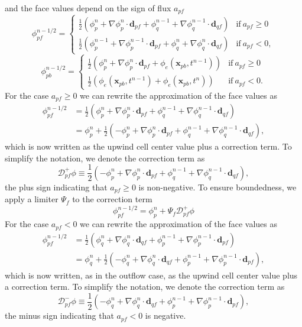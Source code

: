 \documentclass[../thesis.tex]{subfiles}
\begin{document}
and the face values depend on the sign of flux $ a_{pf} $
\[
	\phi_{pf}^{n-1/2} =
	\begin{cases}
		\frac{1}{2}(\phi_p^n + \nabla\phi_p^n\cdot\boldsymbol{d}_{pf} +
		\phi_q^{n-1} + \nabla\phi_q^{n-1}\cdot\boldsymbol{d}_{qf})
		& \text{if}\ a_{pf} \geq 0 \\
		\frac{1}{2}(\phi_p^{n-1} + \nabla\phi_p^{n-1}\cdot\boldsymbol{d}_{pf} +
		\phi_q^{n} + \nabla\phi_q^{n}\cdot\boldsymbol{d}_{qf})
		& \text{if}\ a_{pf} < 0,
	\end{cases}
\]
\[
	\phi_{pb}^{n-1/2} =
	\begin{cases}
		\frac{1}{2}\left(\phi_p^n + \nabla\phi_p^n\cdot\boldsymbol{d}_{pf} +
		\phi_e(\boldsymbol{x}_{pb}, t^{n-1})\right)
		& \text{if}\ a_{pf} \geq 0 \\
		\frac{1}{2}
		\left(
			\phi_e(\boldsymbol{x}_{pb}, t^{n-1})
			+ \phi_e(\boldsymbol{x}_{pb}, t^{n})
		\right)
		& \text{if}\ a_{pf} < 0.
	\end{cases}
\]
For the case $ a_{pf} \geq 0 $ we can rewrite the approximation of the face values as
\begin{equation}
	\begin{split}
		\phi_{pf}^{n-1/2}
		&= \frac{1}{2}(\phi_p^n + \nabla\phi_p^n\cdot\boldsymbol{d}_{pf} +
		\phi_q^{n-1} + \nabla\phi_q^{n-1}\cdot\boldsymbol{d}_{qf}) \\
		&= \phi_p^n + \frac{1}{2}(-\phi_p^n + \nabla\phi_p^n\cdot\boldsymbol{d}_{pf} +
		\phi_q^{n-1} + \nabla\phi_q^{n-1}\cdot\boldsymbol{d}_{qf}),
	\end{split}
\end{equation}
which is now written as the upwind cell center value plus a correction term.
To simplify the notation, we denote the correction term as
\[
	\mathcal{D}^+_{pf}\phi
	\equiv
	\frac{1}{2}(-\phi_p^n + \nabla\phi_p^n\cdot\boldsymbol{d}_{pf} +
	\phi_q^{n-1} + \nabla\phi_q^{n-1}\cdot\boldsymbol{d}_{qf}),
\]
the plus sign indicating that $ a_{pf} \geq 0 $ is non-negative.
To ensure boundedness, we apply a limiter $ \Psi_{f} $ to the correction term
\begin{equation} \label{rec_face}
	\phi_{pf}^{n-1/2} = \phi_p^n + \Psi_{f} \mathcal{D}^+_{pf}\phi
\end{equation}
For the case $ a_{pf} < 0 $ we can rewrite the approximation of the face values as
\begin{equation}
	\begin{split}
		\phi_{pf}^{n-1/2}
		&= \frac{1}{2}(\phi_q^{n} + \nabla\phi_q^{n}\cdot\boldsymbol{d}_{qf} +
		\phi_p^{n-1} + \nabla\phi_p^{n-1}\cdot\boldsymbol{d}_{pf}) \\
		&= \phi_q^{n} + \frac{1}{2}(-\phi_q^{n} + \nabla\phi_q^{n}\cdot\boldsymbol{d}_{qf} +
		\phi_p^{n-1} + \nabla\phi_p^{n-1}\cdot\boldsymbol{d}_{pf}),
	\end{split}
\end{equation}
which is now written, as in the outflow case,
as the upwind cell center value plus a correction term.
To simplify the notation, we denote the correction term as
\[
	\mathcal{D}_{pf}^-\phi
	\equiv
	\frac{1}{2}(-\phi_q^{n} + \nabla\phi_q^{n}\cdot\boldsymbol{d}_{qf} +
	\phi_p^{n-1} + \nabla\phi_p^{n-1}\cdot\boldsymbol{d}_{pf}),
\]
the minus sign indicating that $ a_{pf} < 0 $ is negative.
\end{document}
